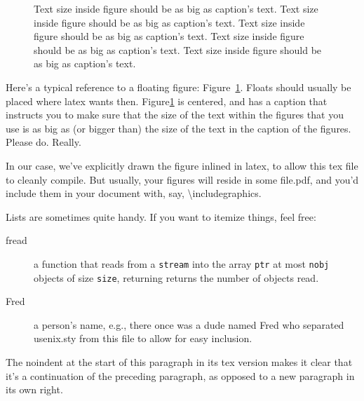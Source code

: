\documentclass[letterpaper,twocolumn,10pt]{article}
\begin{document}
\begin{figure}
\begin{center}
\end{center}
\caption{\label{fig:vectors} Text size inside figure should be as big as
  caption's text. Text size inside figure should be as big as
  caption's text. Text size inside figure should be as big as
  caption's text. Text size inside figure should be as big as
  caption's text. Text size inside figure should be as big as
  caption's text. }
\end{figure}


Here's a typical reference to a floating figure:
Figure~\ref{fig:vectors}. Floats should usually be placed where latex
wants then. Figure\ref{fig:vectors} is centered, and has a caption
that instructs you to make sure that the size of the text within the
figures that you use is as big as (or bigger than) the size of the
text in the caption of the figures. Please do. Really.

In our case, we've explicitly drawn the figure inlined in latex, to
allow this tex file to cleanly compile. But usually, your figures will
reside in some file.pdf, and you'd include them in your document
with, say, \textbackslash{}includegraphics.

Lists are sometimes quite handy. If you want to itemize things, feel
free:

\begin{description}
  
\item[fread] a function that reads from a \texttt{stream} into the
  array \texttt{ptr} at most \texttt{nobj} objects of size
  \texttt{size}, returning returns the number of objects read.

\item[Fred] a person's name, e.g., there once was a dude named Fred
  who separated usenix.sty from this file to allow for easy
  inclusion.
\end{description}

\noindent
The noindent at the start of this paragraph in its tex version makes
it clear that it's a continuation of the preceding paragraph, as
opposed to a new paragraph in its own right.
\end{document}
